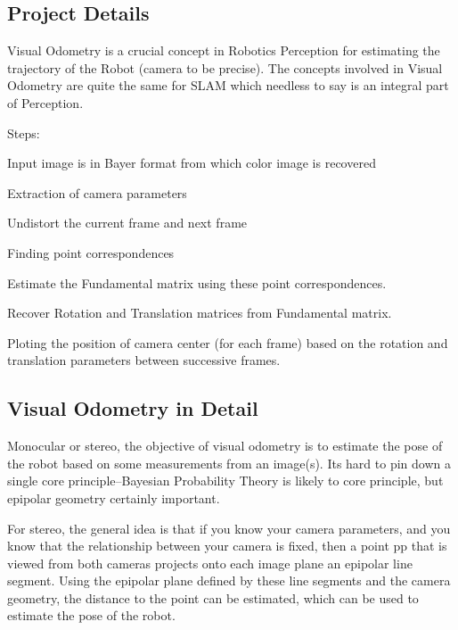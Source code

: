 \href{https://travis-ci.org/bhargavipatel/808X_VO}{\tt } \href{https://coveralls.io/github/bhargavipatel/808X_VO?branch=master}{\tt } \subsection*{\href{https://github.com/bhargavipatel/808X_VO/blob/master/LICENSE}{\tt } }

\subsection*{Project Details}

Visual Odometry is a crucial concept in Robotics Perception for estimating the trajectory of the Robot (camera to be precise). The concepts involved in Visual Odometry are quite the same for S\+L\+AM which needless to say is an integral part of Perception.

Steps\+:
\begin{DoxyItemize}
\item Input image is in Bayer format from which color image is recovered
\item Extraction of camera parameters
\item Undistort the current frame and next frame
\item Finding point correspondences
\item Estimate the Fundamental matrix using these point correspondences.
\item Recover Rotation and Translation matrices from Fundamental matrix.
\item Ploting the position of camera center (for each frame) based on the rotation and translation parameters between successive frames.
\end{DoxyItemize}

\subsection*{Visual Odometry in Detail}

Monocular or stereo, the objective of visual odometry is to estimate the pose of the robot based on some measurements from an image(s). It\textquotesingle{}s hard to pin down a single core principle--Bayesian Probability Theory is likely to core principle, but epipolar geometry certainly important.

For stereo, the general idea is that if you know your camera parameters, and you know that the relationship between your camera is fixed, then a point pp that is viewed from both cameras projects onto each image plane an epipolar line segment. Using the epipolar plane defined by these line segments and the camera geometry, the distance to the point can be estimated, which can be used to estimate the pose of the robot.

